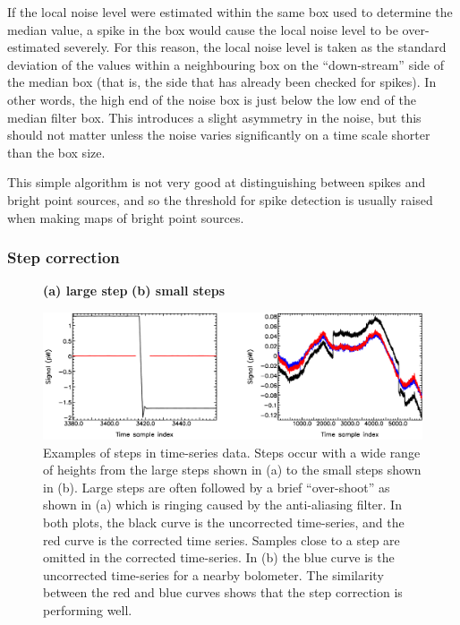 \documentclass[useAMS,usenatbib,nofootinbib]{mn2e}
\begin{document}
If the local noise level were estimated within the same box used to
determine the median value, a spike in the box would cause the local
noise level to be over-estimated severely. For this reason, the local
noise level is taken as the standard deviation of the values within a
neighbouring box on the ``down-stream'' side of the median box (that
is, the side that has already been checked for spikes). In other
words, the high end of the noise box is just below the low end of the
median filter box. This introduces a slight asymmetry in the noise,
but this should not matter unless the noise varies significantly on a
time scale shorter than the box size.

This simple algorithm is not very good at distinguishing between spikes
and bright point sources, and so the threshold for spike detection is
usually raised when making maps of bright point sources.

\subsubsection{Step correction}
\label{sec:steps}

\begin{figure}
\raggedright
\textbf{(a) large step} \hspace{7.3cm} \textbf{(b) small steps}\\

\vspace{0.2cm}

\includegraphics[width=\linewidth]{steps1}
\caption{Examples of steps in time-series data. Steps occur with a
wide range of heights from the large steps shown in (a) to the small
steps shown in (b). Large steps are often followed by a brief
``over-shoot'' as shown in (a) which is ringing caused by the
anti-aliasing filter. In both plots, the black curve is the
uncorrected time-series, and the red curve is the corrected time
series. Samples close to a step are omitted in the corrected
time-series.  In (b) the blue curve is the uncorrected time-series for
a nearby bolometer. The similarity between the red and blue curves
shows that the step correction is performing well.  }
\label{fig:steps1}
\end{figure}
\end{document}
